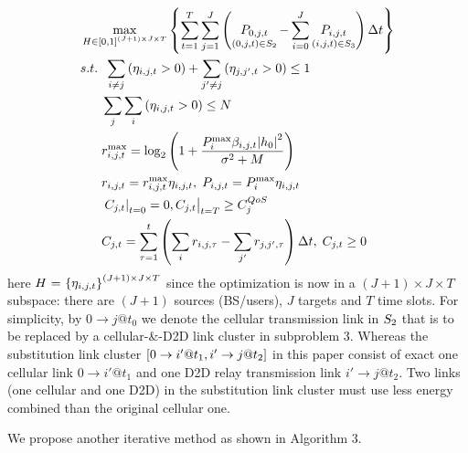 \documentclass{ieeeaccess}
\begin{document}
\begin{subequations}
\begin{align}
& \mathop {\max }\limits_{{\bf{{\rm H}}} \in {{\left[ {0,1} \right]}^{\left( {J + 1} \right) \times J \times T}}} \left\{ {\sum\limits_{t = 1}^T {\sum\limits_{j = 1}^J {\left( {\mathop {{P_{0,j,t}}}\limits_{\left( {0,j,t} \right) \in {{\bf{S}}_{\bf{2}}}}  - \sum\limits_{i = 0}^J {\mathop {{P_{i,j,t}}}\limits_{\left( {i,j,t} \right) \in {{\bf{S}}_{\bf{3}}}} } } \right)\Delta t} } } \right\} \\
& {s.t.} \;\; \sum\limits_{i \ne j} {\left( {{\eta _{i,j,t}} > 0} \right)}  + \sum\limits_{j' \ne j} {\left( {{\eta _{j,j',t}} > 0} \right) \le {\text{1}}} \\
& \;\;\;\;\;\; \sum\limits_j {\sum\limits_i {\left( {{\eta _{i,j,t}} > 0} \right)} }  \le N \\
& \;\;\;\;\;\; r_{i,j,t}^{\max } = {\log _2}\left( {1 + \frac{{P_i^{\max }{\beta _{i,j,t}}{{\left| {{h_0}} \right|}^2}}}{{{\sigma ^2} + M}}} \right) \\
& \;\;\;\;\;\; {r_{i,j,t}} = r_{i,j,t}^{\max }{\eta _{i,j,t}},\; {P_{i,j,t}} = P_i^{\max }{\eta _{i,j,t}} \\
& \;\;\;\;\;\; {\left. {{{\left. {{C_{j,t}}} \right|}_{t = 0}} = 0, {C_{j,t}}} \right|_{t = T}} \ge C_j^{QoS} \\
& \;\;\;\;\;\; {C_{j,t}} = \sum\limits_{\tau  = 1}^t {\left( {\sum\limits_i {{r_{i,j,\tau }}}  - \sum\limits_{j'} {{r_{j,j',\tau }}} } \right)\Delta t} ,\; {C_{j,t}} \ge 0
\end{align}
\end{subequations}
here ${\bf{{\rm H}}}{\text{ = }}{\left\{ {{\eta _{i,j,t}}} \right\}^{\left( {J + 1} \right) \times J \times T}}$ since the optimization is now in a $\left( {J + 1} \right) \times J \times T$ subspace: there are $\left( {J + 1} \right)$ sources (BS/users), $J$ targets and $T$ time slots. For simplicity, by $0 \to j@{t_0}$ we denote the cellular transmission link in ${{\bf{S}}_{\bf{2}}}$ that is to be replaced by a cellular-\&-D2D link cluster in subproblem 3. Whereas the substitution link cluster $\left[ {{\rm{0}} \to i'@{t_1},i' \to j@{t_2}} \right]$ in this paper consist of exact one cellular link $0 \to i'@{t_1}$ and one D2D relay transmission link $i' \to j@{t_2}$. Two links (one cellular and one D2D) in the substitution link cluster must use less energy combined than the original cellular one.

We propose another iterative method as shown in Algorithm 3.
\end{document}
